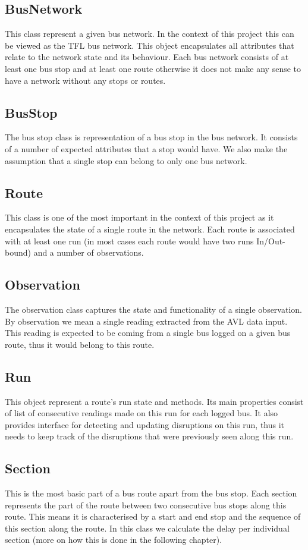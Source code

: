 \subsection{BusNetwork}
This class represent a given bus network. In the context of this project this can be viewed as the TFL bus network. This object encapsulates all attributes that relate to the network state and its behaviour. Each bus network consists of at least one bus stop and at least one route otherwise it does not make any sense to have a network without any stops or routes.

\subsection{BusStop}
The bus stop class is representation of a bus stop in the bus network. It consists of a number of expected attributes that a stop would have. We also make the assumption that a single stop can belong to only one bus network.

\subsection{Route}
This class is one of the most important in the context of this project as it encapsulates the state of a single route in the network. Each route is associated with at least one run (in most cases each route would have two runs In/Out-bound) and a number of observations. 

\subsection{Observation}
The observation class captures the state and functionality of a single observation. By observation we mean a single reading extracted from the AVL data input. This reading is expected to be coming from a single bus logged on a given bus route, thus it would belong to this route. 

\subsection{Run}
This object represent a route's run state and methods. Its main properties consist of list of consecutive readings made on this run for each logged bus. It also provides interface for detecting and updating disruptions on this run, thus it needs to keep track of the disruptions that were previously seen along this run.

\subsection{Section}
This is the most basic part of a bus route apart from the bus stop. Each section represents the part of the route between two consecutive bus stops along this route. This means it is characterised by a start and end stop and the sequence of this section along the route. In this class we calculate the delay per individual section (more on how this is done in the following chapter).

